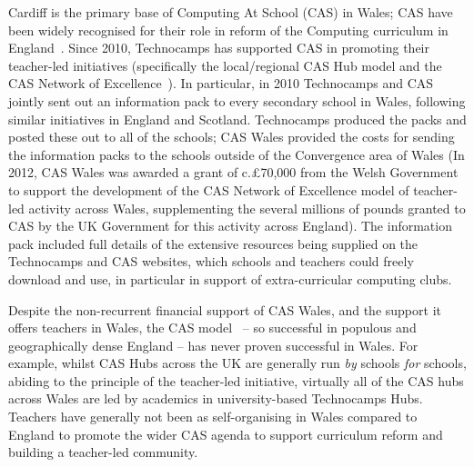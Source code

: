 \documentclass{llncs}
\begin{document}

Cardiff is the primary base of Computing At School (CAS) in Wales; CAS
have been widely recognised for their role in reform of the Computing curriculum in
England~\cite{brown-et-al-toce2014}. Since 2010, Technocamps has
supported CAS in promoting their teacher-led initiatives (specifically
the local/regional CAS Hub model and the CAS Network of
Excellence~\cite{brown-et-al-toce2014,sentance-et-al:wipsce2014}).
In particular, in 2010 Technocamps and CAS jointly sent out an
information pack to every secondary school in Wales, following similar
initiatives in England and Scotland. Technocamps produced the packs
and posted these out to all of the schools; CAS Wales provided the
costs for sending the information packs to the schools outside of the
Convergence area of Wales (In 2012, CAS Wales was awarded a grant of c.\pounds70,000
from the Welsh Government to support the development of the CAS Network of
Excellence model of teacher-led activity across Wales, supplementing
the several millions of pounds granted to CAS by the UK Government for
this activity across England).  The information pack included full
details of the extensive resources being supplied on the Technocamps
and CAS websites, which schools and teachers could freely download and
use, in particular in support of extra-curricular computing clubs.

 

Despite the non-recurrent financial support of CAS Wales, and the
support it offers teachers in Wales, the CAS
model~\cite{sentance-et-al:wipsce2014} -- so successful in populous and
geographically dense England -- has never proven successful in Wales.
For example, whilst CAS Hubs across the UK are generally run \emph{by}
schools \emph{for} schools, abiding to the principle of the
teacher-led initiative, virtually all of the CAS hubs across Wales are
led by academics in university-based Technocamps Hubs.
Teachers have generally not been as self-organising in Wales compared
to England to promote the wider CAS agenda to support
curriculum reform and building a teacher-led community.
\end{document}
